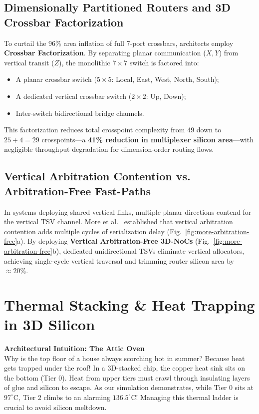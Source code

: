 \subsection{Dimensionally Partitioned Routers and 3D Crossbar Factorization}
To curtail the 96\% area inflation of full 7-port crossbars, architects employ \textbf{Crossbar Factorization}. By separating planar communication ($X, Y$) from vertical transit ($Z$), the monolithic $7 \times 7$ switch is factored into:
\begin{itemize}
    \item A planar crossbar switch ($5 \times 5$: Local, East, West, North, South);
    \item A dedicated vertical crossbar switch ($2 \times 2$: Up, Down);
    \item Inter-switch bidirectional bridge channels.
\end{itemize}
This factorization reduces total crosspoint complexity from 49 down to $25 + 4 = 29$ crosspoints—a \textbf{41\% reduction in multiplexer silicon area}—with negligible throughput degradation for dimension-order routing flows.

\subsection{Vertical Arbitration Contention vs. Arbitration-Free Fast-Paths}

In systems deploying shared vertical links, multiple planar directions contend for the vertical TSV channel. More et al.~\cite{More2018} established that vertical arbitration contention adds multiple cycles of serialization delay (Fig.~\ref{fig:more-arbitration-free}a). By deploying \textbf{Vertical Arbitration-Free 3D-NoCs} (Fig.~\ref{fig:more-arbitration-free}b), dedicated unidirectional TSVs eliminate vertical allocators, achieving single-cycle vertical traversal and trimming router silicon area by $\approx 20\%$.

\section{Thermal Stacking \& Heat Trapping in 3D Silicon}
\label{sec:thermal-stacking}

\begin{svgraybox}
\textbf{Architectural Intuition: The Attic Oven} \\
Why is the top floor of a house always scorching hot in summer? Because heat gets trapped under the roof! In a 3D-stacked chip, the copper heat sink sits on the bottom (Tier 0). Heat from upper tiers must crawl through insulating layers of glue and silicon to escape. As our simulation demonstrates, while Tier 0 sits at $97^\circ\mathrm{C}$, Tier 2 climbs to an alarming $136.5^\circ\mathrm{C}$! Managing this thermal ladder is crucial to avoid silicon meltdown.
\end{svgraybox}


